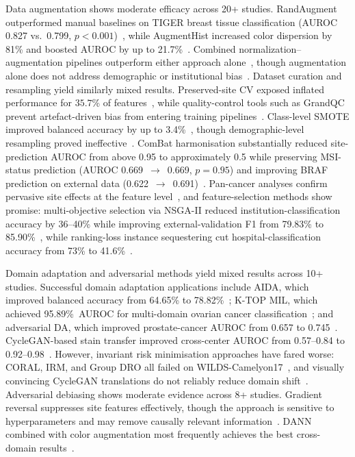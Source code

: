 Data augmentation shows moderate efficacy across 20+ studies. RandAugment
outperformed manual baselines on TIGER breast tissue classification (AUROC 0.827 vs.\ 0.799,
$p < 0.001$)~\citep{faryna2024automatic}, while AugmentHist increased color
dispersion by 81\% and boosted AUROC by up to
21.7\%~\citep{franchet2024bias}. Combined normalization--augmentation
pipelines outperform either approach alone~\citep{franchet2024bias}, though augmentation
alone does not address demographic or institutional
bias~\citep{howard2021site}. Dataset curation and resampling yield similarly mixed results. Preserved-site CV exposed inflated performance for $35.7$\% of
features~\citep{howard2021site}, while quality-control tools such as GrandQC
prevent artefact-driven bias from entering training
pipelines~\citep{weng2024grandqc}. Class-level SMOTE improved balanced
accuracy by up to 3.4\%~\citep{rezama2018imbalanced}, though
demographic-level resampling proved
ineffective~\citep{soltan2024challenges}. ComBat harmonisation substantially reduced site-prediction AUROC from
above 0.95 to approximately 0.5 while preserving MSI-status prediction
(AUROC 0.669~$\to$~0.669, $p = 0.95$) and improving BRAF prediction
on external data (0.622~$\to$~0.691)~\citep{murchan2024combat}.
Pan-cancer analyses confirm pervasive site effects at the feature
level~\citep{chen2022pan}, and feature-selection methods show promise: multi-objective selection via
NSGA-II reduced institution-classification accuracy by 36--40\% while
improving external-validation F1 from 79.83\% to
85.90\%~\citep{bidgoli2022bias}, while ranking-loss instance sequestering
cut hospital-classification accuracy from 73\% to
41.6\%~\citep{mazaheri2023ranking}.

\label{sec:results:mit:ssl}%
Domain adaptation and adversarial methods yield mixed results across 10+ studies. Successful domain adaptation applications include AIDA, which improved balanced accuracy from 64.65\% to
78.82\%~\citep{asadiaghbolagh2024learning}; K-TOP MIL, which achieved 95.89\%~AUROC
for multi-domain ovarian cancer classification~\citep{ahmed2025robust}; and adversarial DA, which improved
prostate-cancer AUROC from 0.657 to
0.745~\citep{ren2019unsupervised}. CycleGAN-based stain transfer
improved cross-center AUROC from 0.57--0.84 to
0.92--0.98~\citep{nerrienet2023standardized}. However, invariant risk minimisation approaches have fared worse: CORAL, IRM, and
Group DRO all failed on WILDS-Camelyon17~\citep{koh2021wilds}, and visually
convincing CycleGAN translations do not reliably reduce domain
shift~\citep{vasiljevic2022cyclegan}. Adversarial debiasing shows moderate evidence across 8+ studies. Gradient reversal suppresses site
features effectively, though the approach is sensitive to hyperparameters and
may remove causally relevant
information~\citep{lafarge2019learning, otalora2019staining}. DANN
combined with color augmentation most frequently achieves the best
cross-domain results~\citep{otalora2019staining}.

